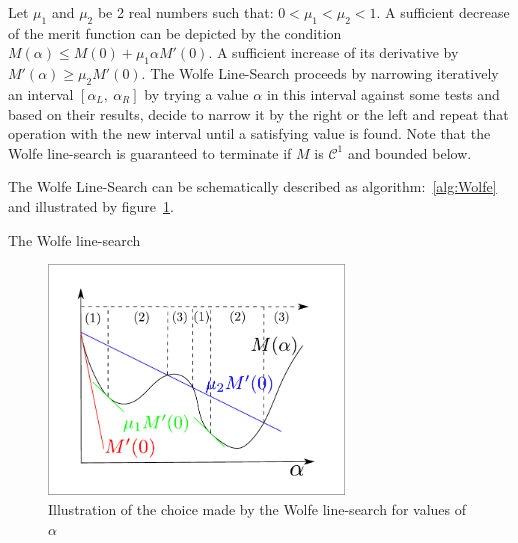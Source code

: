 Let $\mu_1$ and $\mu_2$ be 2 real numbers such that: $0<\mu_1<\mu_2<1$.
A sufficient decrease of the merit function can be depicted by the condition $M(\alpha) \leq M(0) + \mu_1 \alpha M'(0)$.
A sufficient increase of its derivative by $M'(\alpha)\geq\mu_2 M'(0)$.
The Wolfe Line-Search proceeds by narrowing iteratively an interval $[\alpha_L,\ \alpha_R]$ by trying a value $\alpha$ in this interval against some tests and based on their results, decide to narrow it by the right or the left and repeat that operation with the new interval until a satisfying value is found.
Note that the Wolfe line-search is guaranteed to terminate if $M$ is $\mathcal{C}^1$ and bounded below.

The Wolfe Line-Search can be schematically described as algorithm:~\ref{alg:Wolfe} and illustrated by figure~\ref{fig:Wolfe}.

\begin{algorithm}
\begin{algorithmic}
  \EndLoop{}
  \caption{The Wolfe line-search}
\label{alg:Wolfe}
\end{algorithmic}
\end{algorithm}

\begin{figure}
  \centering
  \includegraphics[width=0.7\textwidth]{line-search.pdf}
  \caption{Illustration of the choice made by the Wolfe line-search for values of $\alpha$}
\label{fig:Wolfe}
\end{figure}

